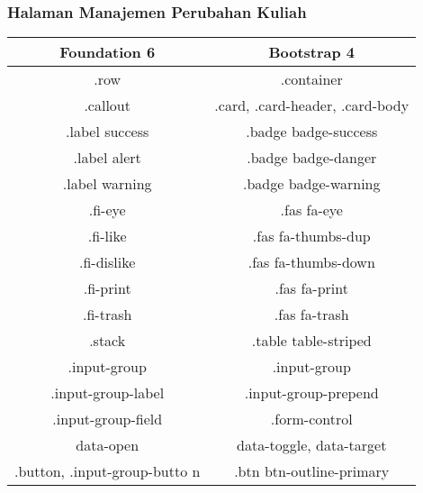 \subsubsection{Halaman Manajemen Perubahan Kuliah}
\begin{tabular}{|c|c|} 
	\hline
	\textbf{Foundation 6} & \textbf{Bootstrap 4}  \\ [0.5ex] 
	\hline\hline
	.row &   .container\\ 
	\hline	
	.callout &  .card, .card-header, .card-body \\
	\hline		
	.label success &  .badge badge-success \\
	\hline	
	.label alert & .badge badge-danger  \\
	\hline	
	.label warning & .badge badge-warning  \\
	\hline	
	.fi-eye &  .fas fa-eye \\
	\hline	
	.fi-like &  .fas fa-thumbs-dup \\	
	\hline	
	.fi-dislike &  .fas fa-thumbs-down \\
	\hline	
	.fi-print &  .fas fa-print \\
	\hline	
	.fi-trash &  .fas fa-trash \\
	\hline	
	.stack & .table table-striped  \\
	\hline	
	.input-group & .input-group  \\ 
	\hline	
	.input-group-label & .input-group-prepend  \\ 
	\hline	
	.input-group-field & .form-control \\ 
	\hline	
	data-open & data-toggle, data-target \\
	\hline	
	.button, .input-group-butto n& .btn btn-outline-primary  \\ [1ex] 
	\hline
\end{tabular}

